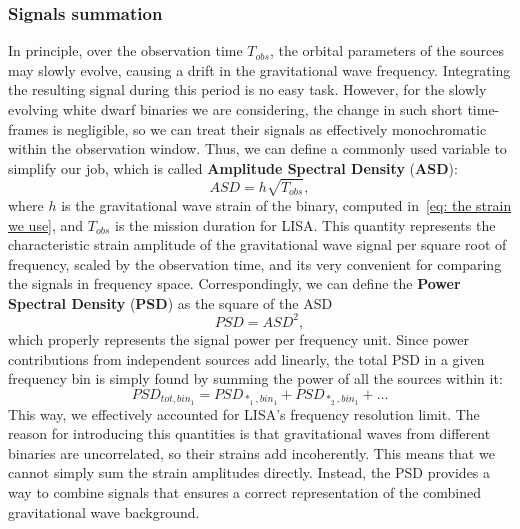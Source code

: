 \subsubsection{Signals summation}
In principle, over the observation time $T_{obs}$, the orbital parameters of the sources may slowly evolve, causing a drift in the gravitational wave frequency. 
Integrating the resulting signal during this period is no easy task.
However, for the slowly evolving white dwarf binaries we are considering, the change in such short time-frames is negligible, so we can treat their signals as effectively monochromatic within the observation window. 
Thus, we can define a commonly used variable to simplify our job, which is called  \textbf{Amplitude Spectral Density} (\textbf{ASD}):
\begin{equation}
    ASD = h\sqrt{T_{obs}},
    \label{eq: ASD definition}
\end{equation}
where $h$ is the gravitational wave strain of the binary, computed in~\eqref{eq: the strain we use}, and $T_{obs}$ is the mission duration for LISA.
This quantity represents the characteristic strain amplitude of the gravitational wave signal per square root of frequency, scaled by the observation time, and its very convenient for comparing the signals in frequency space.
Correspondingly, we can define the \textbf{Power Spectral Density} (\textbf{PSD}) as the square of the ASD
\begin{equation}
    PSD = ASD^2,
    \label{eq: PSD definition}
\end{equation}
which properly represents the signal power per frequency unit.
Since power contributions from independent sources add linearly, the total PSD in a given frequency bin is simply found by summing the power of all the sources within it:
\begin{equation}
    PSD_{tot,bin_1} = PSD_{*_1,bin_1} + PSD_{*_2,bin_1} + \dots
    \label{eq: total PSD}
\end{equation}
This way, we effectively accounted for LISA's frequency resolution limit.
The reason for introducing this quantities is that gravitational waves from different binaries are uncorrelated, so their strains add incoherently. 
This means that we cannot simply sum the strain amplitudes directly.
Instead, the PSD provides a way to combine signals that ensures a correct representation of the combined gravitational wave background.

